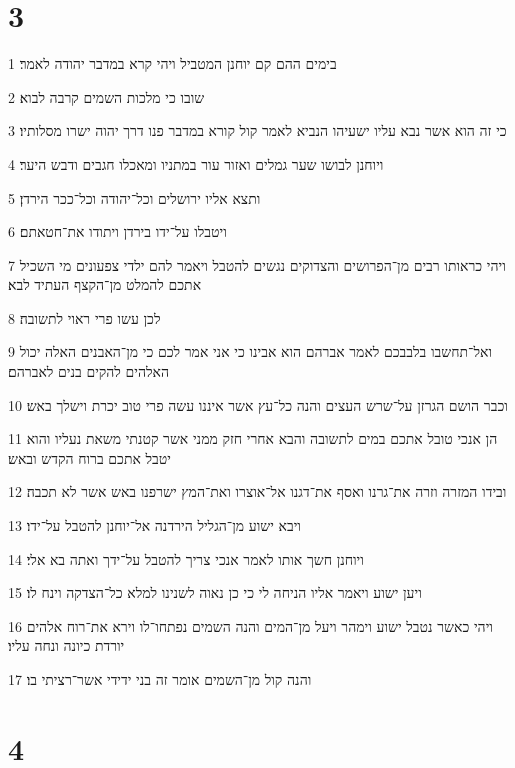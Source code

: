 \chapter{3}

\par 1 בימים ההם קם יוחנן המטביל ויהי קרא במדבר יהודה לאמר׃
\par 2 שובו כי מלכות השמים קרבה לבוא׃
\par 3 כי זה הוא אשר נבא עליו ישעיהו הנביא לאמר קול קורא במדבר פנו דרך יהוה ישרו מסלותיו׃
\par 4 ויוחנן לבושו שער גמלים ואזור עור במתניו ומאכלו חגבים ודבש היער׃
\par 5 ותצא אליו ירושלים וכל־יהודה וכל־ככר הירדן׃
\par 6 ויטבלו על־ידו בירדן ויתודו את־חטאתם׃
\par 7 ויהי כראותו רבים מן־הפרושים והצדוקים נגשים להטבל ויאמר להם ילדי צפעונים מי השכיל אתכם להמלט מן־הקצף העתיד לבא׃
\par 8 לכן עשו פרי ראוי לתשובה׃
\par 9 ואל־תחשבו בלבבכם לאמר אברהם הוא אבינו כי אני אמר לכם כי מן־האבנים האלה יכול האלהים להקים בנים לאברהם׃
\par 10 וכבר הושם הגרזן על־שרש העצים והנה כל־עץ אשר איננו עשה פרי טוב יכרת וישלך באש׃
\par 11 הן אנכי טובל אתכם במים לתשובה והבא אחרי חזק ממני אשר קטנתי משאת נעליו והוא יטבל אתכם ברוח הקדש ובאש׃
\par 12 ובידו המזרה וזרה את־גרנו ואסף את־דגנו אל־אוצרו ואת־המץ ישרפנו באש אשר לא תכבה׃
\par 13 ויבא ישוע מן־הגליל הירדנה אל־יוחנן להטבל על־ידו׃
\par 14 ויוחנן חשך אותו לאמר אנכי צריך להטבל על־ידך ואתה בא אלי׃
\par 15 ויען ישוע ויאמר אליו הניחה לי כי כן נאוה לשנינו למלא כל־הצדקה וינח לו׃
\par 16 ויהי כאשר נטבל ישוע וימהר ויעל מן־המים והנה השמים נפתחו־לו וירא את־רוח אלהים יורדת כיונה ונחה עליו׃
\par 17 והנה קול מן־השמים אומר זה בני ידידי אשר־רציתי בו׃

\chapter{4}

